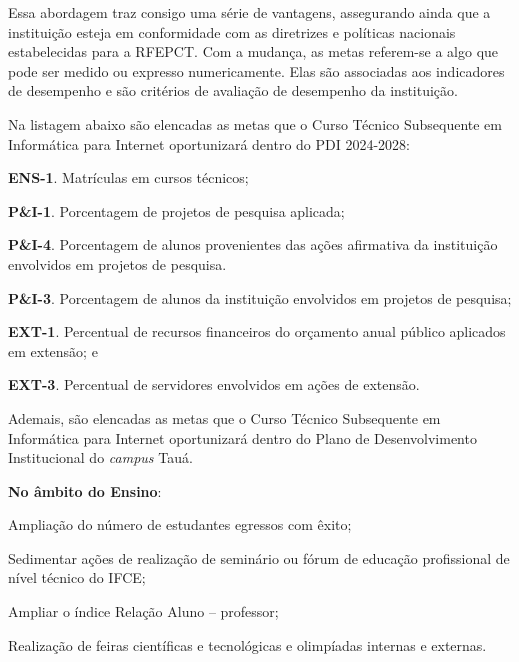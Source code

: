 \documentclass[
	12pt,				%
	openright,			%
	twoside,			%
	a4paper,			%
	chapter=TITLE,		%
	english,			%
	french,				%
	spanish,			%
	brazil,				%
	]{abntex2}
\begin{document}
Essa abordagem traz consigo uma série de vantagens, assegurando ainda que a
instituição esteja em conformidade com as diretrizes e políticas nacionais
estabelecidas para a RFEPCT. Com a mudança, as metas  referem-se a algo que pode ser medido ou expresso numericamente. Elas são
associadas aos indicadores de desempenho e são critérios de avaliação de desempenho da instituição.

Na listagem abaixo  são elencadas as metas que o  Curso Técnico Subsequente em
Informática para Internet oportunizará dentro do PDI 2024-2028:
\begin{alineas}
\item \textbf{ENS-1}. 
Matrículas em cursos
técnicos;
	\item \textbf{P\&I-1}.
Porcentagem de projetos
de pesquisa aplicada;
\item \textbf{P\&I-4}.
Porcentagem de alunos
provenientes das ações
afirmativa da instituição
envolvidos em projetos de
pesquisa. 
	\item \textbf{P\&I-3}. Porcentagem de alunos da
instituição envolvidos em
projetos de pesquisa;
\item \textbf{EXT-1}.
Percentual de recursos
financeiros do orçamento
anual público aplicados em
extensão; e 
	\item  \textbf{EXT-3}.
Percentual de servidores
envolvidos em ações de
extensão.
\end{alineas}

Ademais, são elencadas as metas que o Curso Técnico Subsequente em Informática
para Internet oportunizará dentro do Plano de Desenvolvimento Institucional do
\textit{campus} Tauá.

\textbf{No âmbito do Ensino}:

	\begin{alineas}
	  \item Ampliação do número de estudantes egressos com êxito;
	  \item Sedimentar ações de realização de seminário ou fórum de educação profissional de nível técnico do IFCE;
	  \item Ampliar o índice Relação Aluno -- professor;
	  \item Realização de feiras científicas e tecnológicas e olimpíadas internas e externas.
	\end{alineas}
	
\end{document}

